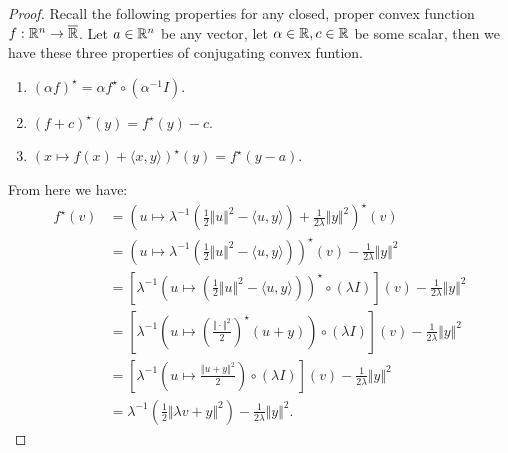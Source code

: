 \documentclass[12pt]{article}
\begin{document}
        \begin{proof}
            Recall the following properties for any closed, proper convex function $f: \mathbb R^n \rightarrow \overline {\mathbb R}$. 
            Let $a \in \mathbb R^n$ be any vector, let $\alpha \in \mathbb R, c \in\mathbb R$ be some scalar, then we have these three properties of conjugating convex funtion. 
            \begin{enumerate}[nosep]
                \item $(\alpha f)^\star = \alpha f^\star \circ (\alpha^{-1}I)$. 
                \item $(f + c)^\star(y) = f^\star(y) - c$. 
                \item $\left(x \mapsto f(x) + \langle x, y\rangle\right)^\star(y) = f^\star(y - a)$. 
            \end{enumerate}
            From here we have: 
            \begin{align*}
                f^\star(v) 
                &= 
                \left(
                   u \mapsto \lambda^{-1}\left(\frac{1}{2}\Vert u\Vert^2 - \langle u, y\rangle\right) 
                    + \frac{1}{2\lambda} \Vert y\Vert^2
                \right)^\star(v)
                \\
                &= \left(
                    u \mapsto \lambda^{-1}\left(\frac{1}{2}\Vert u\Vert^2 - \langle u, y\rangle\right) 
                \right)^\star(v)
                - \frac{1}{2\lambda} \Vert y\Vert^2
                \\
                &= 
                \left[
                    \lambda^{-1}\left(
                    u \mapsto \left(\frac{1}{2}\Vert u\Vert^2 - \langle u, y\rangle\right) 
                \right)^\star\circ(\lambda I)
                \right](v)
                - \frac{1}{2\lambda} \Vert y\Vert^2
                \\
                &= \left[
                    \lambda^{-1}\left(
                    u \mapsto \left(
                        \frac{\Vert \cdot\Vert^2}{2}
                    \right)^\star(u + y)
                \right)\circ(\lambda I)
                \right](v)
                - \frac{1}{2\lambda} \Vert y\Vert^2
                \\
                &= \left[
                    \lambda^{-1}\left(
                        u \mapsto \frac{\Vert u + y\Vert^2}{2}
                    \right)\circ(\lambda I)
                \right](v)
                - \frac{1}{2\lambda} \Vert y\Vert^2
                \\
                &= \lambda^{-1}\left(
                    \frac{1}{2}\Vert \lambda v + y\Vert^2
                \right) 
                - \frac{1}{2\lambda} \Vert y\Vert^2. 
            \end{align*}
        \end{proof}
        


\end{document}
